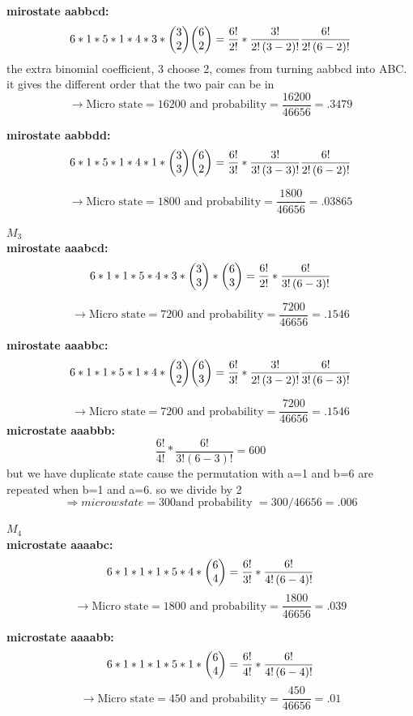 \documentclass{article}
\begin{document}
\begin{flushleft}
\textbf{mirostate aabbcd:}
\[ 6*1*5*1*4*3*\mqty(3\\2)\mqty(6\\2)=\frac{6!}{2!}*\frac{3!}{2!\left(3-2\right)!}\frac{6!}{2!\left(6-2\right)!}\]
the extra binomial coefficient, 3 choose 2, comes from turning aabbcd into ABC. it gives the different order that the two pair can be in
\[ \rightarrow \text{Micro state} = 16200 \text{ and probability} = \frac{16200}{46656}=.3479\]

\textbf{mirostate aabbdd:}
\[ 6*1*5*1*4*1*\mqty(3\\3)\mqty(6\\2)=\frac{6!}{3!}*\frac{3!}{3!\left(3-3\right)!}\frac{6!}{2!\left(6-2\right)!}\]

\[ \rightarrow \text{Micro state} = 1800 \text{ and probability} = \frac{1800}{46656}=.03865\]

\textbf{$M_3$}\\
\textbf{mirostate aaabcd:}
\[ 6*1*1*5*4*3*\mqty(3\\3)*\mqty(6\\3)=\frac{6!}{2!}*\frac{6!}{3!\left(6-3\right)!}\]

\[ \rightarrow \text{Micro state} = 7200 \text{ and probability} = \frac{7200}{46656}=.1546\]

\textbf{mirostate aaabbc:}
\[ 6*1*1*5*1*4*\mqty(3\\2)\mqty(6\\3)=\frac{6!}{3!}*\frac{3!}{2!\left(3-2\right)!}\frac{6!}{3!\left(6-3\right)!}\]

\[ \rightarrow \text{Micro state} = 7200 \text{ and probability} = \frac{7200}{46656}=.1546\]
\textbf{microstate aaabbb:}\\

\[ \frac{6!}{4!}*\frac{6!}{3!\left(6-3\right)!}= 600\]
but we have duplicate state cause the permutation with a=1 and b=6 are repeated when b=1 and a=6. so we divide by 2
\[ \Rightarrow microw state = 300 \text{and probability }= 300/46656=.006\]

\textbf{$M_4$}\\
\textbf{microstate aaaabc:}
\[ 6*1*1*1*5*4*\mqty(6\\4)=\frac{6!}{3!}*\frac{6!}{4!\left(6-4\right)!}\]
\[ \rightarrow \text{Micro state} = 1800 \text{ and probability} = \frac{1800}{46656}=.039\]

\textbf{microstate aaaabb:}
\[ 6*1*1*1*5*1*\mqty(6\\4)=\frac{6!}{4!}*\frac{6!}{4!\left(6-4\right)!}\]
\[ \rightarrow \text{Micro state} = 450 \text{ and probability} = \frac{450}{46656}=.01\]


\end{flushleft}
\end{document}
